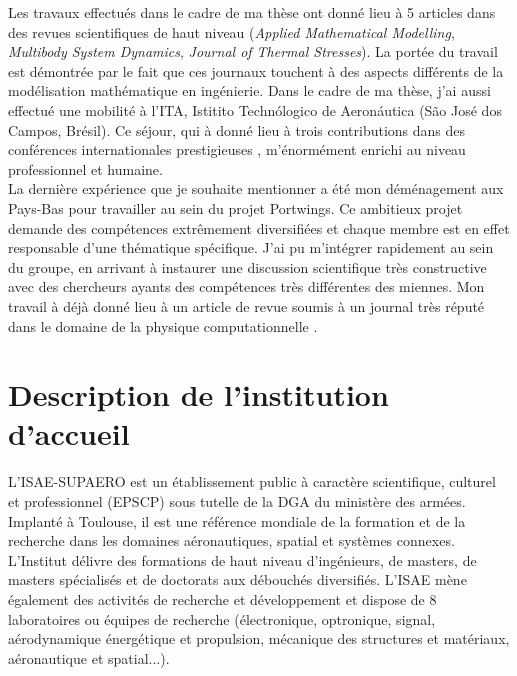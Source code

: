 \documentclass[12pt, french]{article}
\begin{document}
Les travaux effectués dans le cadre de ma thèse ont donné lieu à 5 articles dans des revues scientifiques de haut niveau  (\textit{Applied Mathematical Modelling}, \textit{Multibody System Dynamics}, \textit{Journal of Thermal Stresses}). La portée du travail est démontrée par le fait que ces journaux touchent à des aspects différents de la modélisation mathématique en ingénierie. Dans le cadre de ma thèse, j'ai aussi effectué une  mobilité à l'ITA, Istitito Techn\'ologico de Aeron\'autica (São José dos Campos, Brésil). Ce séjour, qui à donné lieu à trois contributions dans des conférences internationales prestigieuses , m'énormément enrichi au niveau professionnel et humaine. \\

La dernière expérience que je souhaite mentionner a été mon déménagement aux Pays-Bas pour travailler au sein du projet Portwings. Ce ambitieux projet demande des compétences extrêmement diversifiées et chaque membre est en effet responsable d'une thématique spécifique. J'ai pu m'intégrer rapidement au sein du groupe, en arrivant à instaurer une discussion scientifique très constructive avec des chercheurs ayants des compétences très différentes des miennes. Mon travail à déjà donné lieu à un article de revue soumis à un journal très réputé dans le domaine de la physique computationnelle . 


\section{Description de l'institution d'accueil}

L'ISAE-SUPAERO est un établissement public à caractère scientifique, culturel et professionnel (EPSCP) sous tutelle de la DGA du ministère des armées. Implanté à Toulouse, il est une référence mondiale de la formation et de la recherche dans les domaines aéronautiques, spatial et systèmes connexes. L'Institut délivre des
formations de haut niveau d'ingénieurs, de masters, de masters spécialisés et de doctorats aux débouchés diversifiés. L'ISAE mène également des activités de recherche et développement et dispose de 8 laboratoires ou équipes de recherche (électronique, optronique, signal, aérodynamique énergétique et propulsion,
mécanique des structures et matériaux, aéronautique et spatial...).




\end{document}
